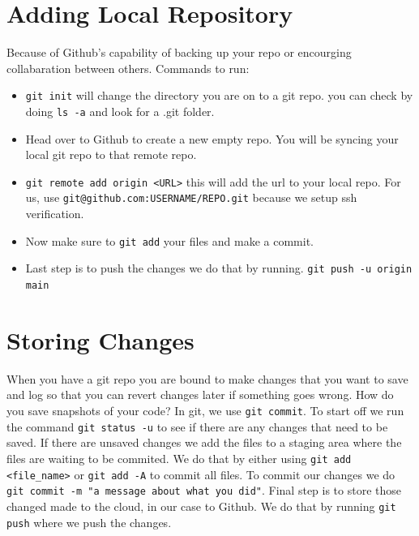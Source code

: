 \documentclass[12pt, a4paper]{article}
\begin{document}
\section{Adding Local Repository}
Because of Github's capability of backing up your repo or encourging collabaration between others. Commands to run:
\begin{itemize}
    \item \verb`git init` will change the directory you are on to a git repo. you can check by doing \verb`ls -a` and look for a .git folder.
    \item Head over to Github to create a new empty repo. You will be syncing your local git repo to that remote repo.
    \item \verb`git remote add origin <URL>` this will add the url to your local repo. For us, use \verb`git@github.com:USERNAME/REPO.git` because we setup ssh verification.
    \item Now make sure to \verb`git add` your files and make a commit.
    \item Last step is to push the changes we do that by running. \verb`git push -u origin main`
\end{itemize}

\section{Storing Changes}

When you have a git repo you are bound to make changes that you want to save and log so that you can revert changes later if something goes wrong. How do you save snapshots of your code? In git, we use \texttt{git commit}. To start off we run the command \texttt{git status -u} to see if there are any changes that need to be saved. If there are unsaved changes we add the files to a staging area where the files are waiting to be commited. We do that by either using \texttt{git add <file\_name>} or \texttt{git add -A} to commit all files. To commit our changes we do \texttt{git commit -m "a message about what you did"}. Final step is to store those changed made to the cloud, in our case to Github. We do that by running \texttt{git push} where we push the changes.\\
\end{document}
